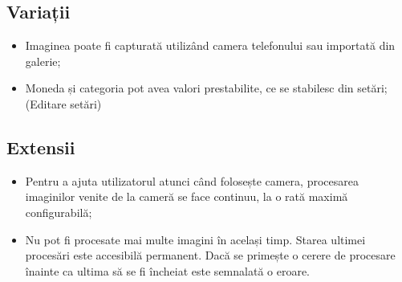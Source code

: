 \begin{minipage}[t]{0.39\textwidth}
  \subsection*{Variații}\label{variaux21bii}
  \begin{itemize}
  \item
    Imaginea poate fi capturată utilizând camera telefonului sau importată
    din galerie;
  \item
    Moneda și categoria pot avea valori prestabilite, ce se stabilesc din
    setări; (Editare setări)
  \end{itemize}
\end{minipage}
\hspace{0.01\textwidth}
\begin{minipage}[t]{0.6\textwidth}
  \subsection*{Extensii}\label{extensii}
  \begin{itemize}
  \item
    Pentru a ajuta utilizatorul atunci când folosește camera, procesarea
    imaginilor venite de la cameră se face continuu, la o rată maximă
    configurabilă;
  \item
    Nu pot fi procesate mai multe imagini în același timp. Starea ultimei
    procesări este accesibilă permanent. Dacă se primește o cerere de
    procesare înainte ca ultima să se fi încheiat este semnalată o eroare.
  \end{itemize}
\end{minipage}

